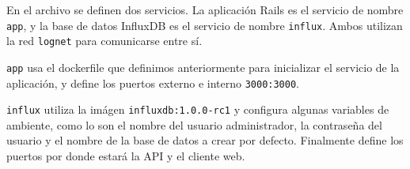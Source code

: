 En el archivo se definen dos servicios. La aplicación Rails es el servicio de nombre \lstinline{app}, y la base de datos InfluxDB es el servicio de nombre \lstinline{influx}. Ambos utilizan la red \lstinline{lognet} para comunicarse entre sí.

\lstinline{app} usa el dockerfile que definimos anteriormente para inicializar el servicio de la aplicación, y define los puertos externo e interno \lstinline{3000:3000}.

\lstinline{influx} utiliza la imágen \lstinline{influxdb:1.0.0-rc1} y configura algunas variables de ambiente, como lo son el nombre del usuario administrador, la contraseña del usuario y el nombre de la base de datos a crear por defecto. Finalmente define los puertos por donde estará la API y el cliente web.
